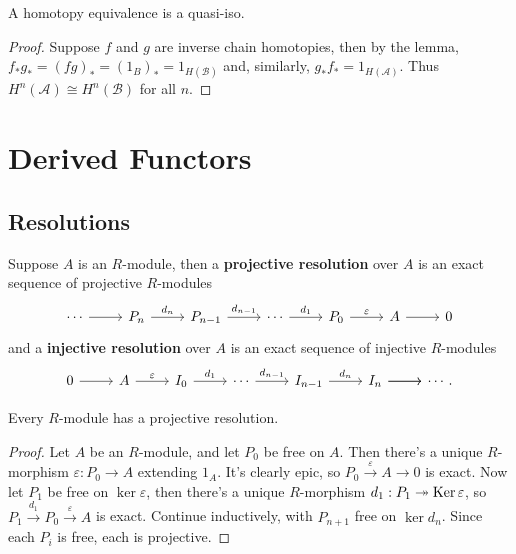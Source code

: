 \documentclass[twoside,10pt]{report}
\begin{document}
\begin{prop}
	\label{homotopy-quasi}
A homotopy equivalence is a quasi-iso.
\end{prop}
\begin{proof}
	Suppose $f$ and $g$ are inverse chain homotopies, then by the lemma, $f_{*}g_{*} = (fg)_{*} = (1_{B})_{*} = 1_{H(\mathcal{B})}$ and, similarly, $g_{*}f_{*}=1_{H(\mathcal{A})}$. Thus $H^n(\mathcal{A}) \cong H^n(\mathcal{B})$ for all $n$.
\end{proof}



\chapter{Derived Functors}

\section{Resolutions}

\begin{defn}[]
Suppose $A$ is an $R$-module, then a \textbf{projective resolution} over $A$ is an exact sequence of projective $R$-modules
\[
\begin{tikzcd}
	\cdots \rar & P_{n}\rar{d_{n}} & P_{n-1}\rar{d_{n-1}} & \cdots \rar{d_1} & P_0 \rar{\varepsilon} & A \rar & 0
\end{tikzcd}
\] 
and a \textbf{injective resolution} over $A$ is an exact sequence of injective $R$-modules
\[
\begin{tikzcd}
	0 \rar & A \rar{\varepsilon} & I_{0} \rar{d_{1}} & \cdots \rar{d_{n-1}} & I_{n-1}\rar{d_{n}} & I_{n} \rar \rar & \cdots.
\end{tikzcd}
\] 
\end{defn}

\begin{thrm}[Existence]
	Every $R$-module has a projective  resolution.
\end{thrm}
\begin{proof}
	Let $A$ be an $R$-module, and let $P_0$ be free on $A$. Then there's a unique $R$-morphism $\varepsilon:P_0\to A$ extending $1_{A}$. It's clearly epic, so $P_0 \stackrel{\varepsilon}{\to } A\to 0$ is exact. Now let $P_1$ be free on $\ker \varepsilon$, then there's a unique $R$-morphism $d_1:P_1\twoheadrightarrow \operatorname{Ker} \varepsilon$, so $P_1\stackrel{d_1}{\to } P_0\stackrel{\varepsilon}{\to } A$ is exact. Continue inductively, with $P_{n+1}$ free on $\ker d_{n}$. Since each $P_i$ is free, each is projective.
\end{proof}
\end{document}
